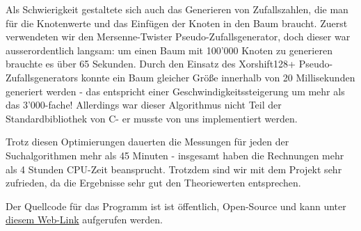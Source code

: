 \documentclass[a4paper,11pt]{article}
\newcommand{\CC}{C\nolinebreak\hspace{-.05em}\raisebox{.4ex}{\tiny\bf +}\nolinebreak\hspace{-.10em}\raisebox{.4ex}{\tiny\bf +}\hspace{.1em}}
\begin{document}
Als Schwierigkeit gestaltete sich auch das Generieren von Zufallszahlen, die man für die Knotenwerte und das Einfügen der Knoten in den Baum braucht. Zuerst verwendeten wir den Mersenne-Twister Pseudo-Zufallsgenerator, doch dieser war ausserordentlich langsam: um einen Baum mit 100'000 Knoten zu generieren brauchte es über 65 Sekunden. Durch den Einsatz des Xorshift128+ Pseudo-Zufallsgenerators konnte ein Baum gleicher Größe innerhalb von 20 Millisekunden generiert werden - das entspricht einer Geschwindigkeitssteigerung um mehr als das 3'000-fache! Allerdings war dieser Algorithmus nicht Teil der Standardbibliothek von \CC - er musste von uns implementiert werden.

Trotz diesen Optimierungen dauerten die Messungen für jeden der Suchalgorithmen mehr als 45 Minuten - insgesamt haben die Rechnungen mehr als 4 Stunden CPU-Zeit beansprucht. Trotzdem sind wir mit dem Projekt sehr zufrieden, da die Ergebnisse sehr gut den Theoriewerten entsprechen.

Der Quellcode für das Programm ist ist öffentlich, Open-Source und kann unter \href{https://github.com/Kepler-69c/binaryTree}{diesem Web-Link} aufgerufen werden.

\pagebreak


\end{document}
